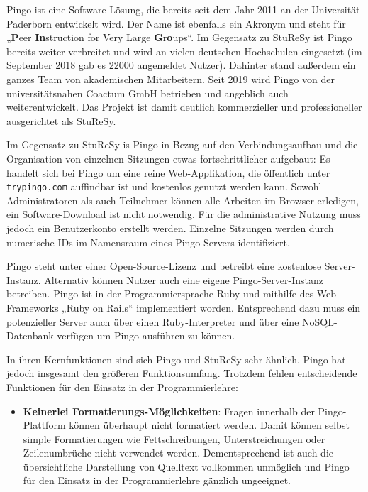 Pingo ist eine Software-Lösung, die bereits seit dem Jahr 2011 an der Universität Paderborn entwickelt wird. Der Name ist ebenfalls ein Akronym und steht für „\textbf{P}eer \textbf{In}struction for Very Large \textbf{G}r\textbf{o}ups“. Im Gegensatz zu StuReSy ist Pingo bereits weiter verbreitet und wird an vielen deutschen Hochschulen eingesetzt (im September 2018 gab es 22000 angemeldet Nutzer). Dahinter stand außerdem ein ganzes Team von akademischen Mitarbeitern. Seit 2019 wird Pingo von der universitätsnahen Coactum GmbH betrieben und angeblich auch weiterentwickelt. Das Projekt ist damit deutlich kommerzieller und professioneller ausgerichtet als StuReSy.

Im Gegensatz zu StuReSy is Pingo in Bezug auf den Verbindungsaufbau und die Organisation von einzelnen Sitzungen etwas fortschrittlicher aufgebaut: Es handelt sich bei Pingo um eine reine Web-Applikation, die öffentlich unter \texttt{trypingo.com} auffindbar ist und kostenlos genutzt werden kann. Sowohl Administratoren als auch Teilnehmer können alle Arbeiten im Browser erledigen, ein Software-Download ist nicht notwendig. Für die administrative Nutzung muss jedoch ein Benutzerkonto erstellt werden. Einzelne Sitzungen werden durch numerische IDs im Namensraum eines Pingo-Servers identifiziert.


Pingo steht unter einer Open-Source-Lizenz und betreibt eine kostenlose Server-Instanz. Alternativ können Nutzer auch eine eigene Pingo-Server-Instanz betreiben. Pingo ist in der Programmiersprache Ruby und mithilfe des Web-Frameworks „Ruby on Rails“ implementiert worden. Entsprechend dazu muss ein potenzieller Server auch über einen Ruby-Interpreter und über eine NoSQL-Datenbank verfügen um Pingo ausführen zu können.

In ihren Kernfunktionen sind sich Pingo und StuReSy sehr ähnlich. Pingo hat jedoch insgesamt den größeren Funktionsumfang. Trotzdem fehlen entscheidende Funktionen für den Einsatz in der Programmierlehre:
\begin{itemize}
    \item \textbf{Keinerlei Formatierungs-Möglichkeiten}: Fragen innerhalb der Pingo-Plattform können überhaupt nicht formatiert werden. Damit können selbst simple Formatierungen wie Fettschreibungen, Unterstreichungen oder Zeilenumbrüche nicht verwendet werden. Dementsprechend ist auch die übersichtliche Darstellung von Quelltext vollkommen unmöglich und Pingo für den Einsatz in der Programmierlehre gänzlich ungeeignet.
\end{itemize}

